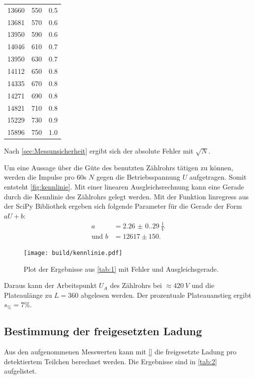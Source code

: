 \begin{table}[H]
\begin{tabular}{c c c}
      13660 & 550 & 0.5\\
      13681 & 570 & 0.6\\
      13950 & 590 & 0.6\\
      14046 & 610 & 0.7\\
      13950 & 630 & 0.7\\
      14112 & 650 & 0.8\\
      14335 & 670 & 0.8\\
      14271 & 690 & 0.8\\
      14821 & 710 & 0.8\\
      15229 & 730 & 0.9\\
      15896 & 750 & 1.0\\
      \bottomrule
  \end{tabular}
  \label{tab:1}
\end{table}

Nach \autoref{sec:Messunsicherheit} ergibt sich der absolute Fehler mit $\sqrt{N}$.

Um eine Aussage über die Güte des benutzten Zählrohrs tätigen zu können, werden die Impulse pro 60s $N$ gegen die
Betriebsspannung $U$ aufgetragen. Somit entsteht \autoref{fig:kennlinie}.
Mit einer linearen Ausgleichsrechnung kann eine Gerade durch die Kennlinie des Zählrohrs gelegt werden.
Mit der Funktion linregress aus der SciPy Bibliothek \cite{scipy} ergeben sich folgende Parameter für die Gerade der Form $aU + b$:
\begin{align*}
  a &= \SI{2.26(0.29)}{\frac{1}{V}}\\
  \text{und } b &= 12617 \pm 150.
\end{align*}

\begin{figure}[H]
  \texttt{[image: build/kennlinie.pdf]}
  \caption{Plot der Ergebnisse aus \autoref{tab:1} mit Fehler und Ausgleichsgerade.}
  \label{fig:kennlinie}
\end{figure}

Daraus kann der Arbeitspunkt $U_A$ des Zählrohrs bei $\approx \SI{420}{V}$ und die Plateaulänge zu $L = 360$ abgelesen werden.
Der prozentuale Plateauanstieg ergibt $s_{\%} = 7\%$.

\subsection{Bestimmung der freigesetzten Ladung}
Aus den aufgenommenen Messwerten kann mit \autoref{} die freigesetzte Ladung pro detektiertem Teilchen berechnet werden.
Die Ergebnisse sind in \autoref{tab:2} aufgelistet.

